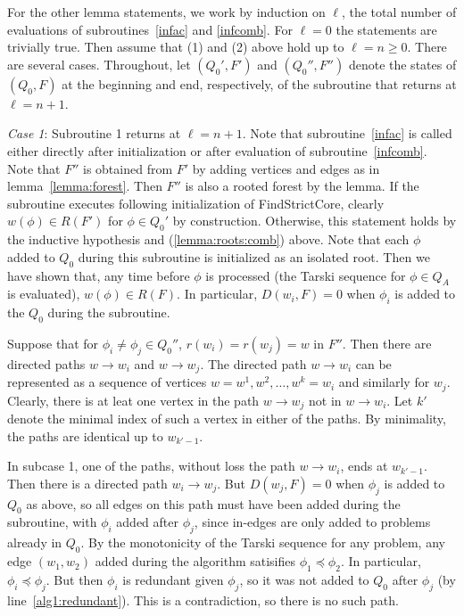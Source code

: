 \documentclass[11pt,reqno]{amsart}
\theoremstyle{definition}
\numberwithin{equation}{section}
\newcommand{\pre}{\phi}
\newcommand{\peq}{\preceq}
\newcommand{\acto}{Q_0}
\newcommand{\acta}{Q_A}
\newcommand{\forest}{F}
\newcommand{\roott}{R}
\newcommand{\depth}{D}
\begin{document}
\begin{enumerate}
For the other lemma statements, we work by induction on $\ell$, the total number of evaluations of subroutines~\ref{infac} and \ref{infcomb}. 
For $\ell = 0$ the statements are trivially true. 
Then assume that (1) and (2) above hold up to $\ell = n \geq 0$. 
There are several cases. 
Throughout, let $(\acto',\forest')$ and $(\acto'',\forest'')$ denote the states of $(\acto,\forest)$ at the beginning and end, respectively, of the subroutine that returns at $\ell = n + 1$.  

\emph{Case 1}: Subroutine 1 returns at $\ell = n + 1$. 
Note that subroutine~\ref{infac} is called either directly after initialization or after evaluation of subroutine~\ref{infcomb}. 
Note that $\forest''$ is obtained from $\forest'$ by adding vertices and edges as in lemma~\ref{lemma:forest}. 
Then $\forest''$ is also a rooted forest by the lemma.
If the subroutine executes following initialization of FindStrictCore, clearly $w(\pre) \in \roott(\forest')$ for $\pre \in \acto'$ by construction.
Otherwise, this statement holds by the inductive hypothesis and (\ref{lemma:roots:comb}) above. 
Note that each $\pre$ added to $\acto$ during this subroutine is initialized as an isolated root. 
Then we have shown that, any time before $\pre$ is processed (the Tarski sequence for $\pre \in \acta$ is evaluated), $w(\pre) \in \roott(\forest)$. 
In particular, $\depth(w_i, \forest) = 0$ when $\pre_i$ is added to the $\acto$ during the subroutine. 

Suppose that for $\pre_i \not = \pre_j \in \acto''$, $r(w_i) = r(w_j) = w$ in $\forest''$. 
Then there are directed paths $w \to w_i$ and $w \to w_j$. 
The directed path $w \to w_i$ can be represented as a sequence of vertices $w = w^1,w^2,\hdots, w^k = w_i$ and similarly for $w_j$. 
Clearly, there is at leat one vertex in the path $w \to w_j$ not in $w \to w_i$. 
Let $k'$ denote the minimal index of such a vertex in either of the paths. 
By minimality, the paths are identical up to $w_{k' - 1}$. 

In subcase 1, one of the paths, without loss the path $w \to w_i$, ends at $w_{k'-1}$. 
Then there is a directed path $w_i \to w_j$.
But $\depth(w_j, \forest) = 0$ when $\pre_j$ is added to $\acto$ as above, so all edges on this path must have been added during the subroutine, with $\pre_i$ added after $\pre_j$, since in-edges are only added to problems already in $\acto$. %
By the monotonicity of the Tarski sequence for any problem, any edge $(w_1,w_2)$ added during the algorithm satisifies $\pre_1 \peq \pre_2$. 
In particular, $\pre_i \peq \pre_j$. 
But then $\pre_i$ is redundant given $\pre_j$, so it was not added to $\acto$ after $\pre_j$ (by line~\ref{alg1:redundant}). 
This is a contradiction, so there is no such path.


\end{enumerate}
\end{document}
